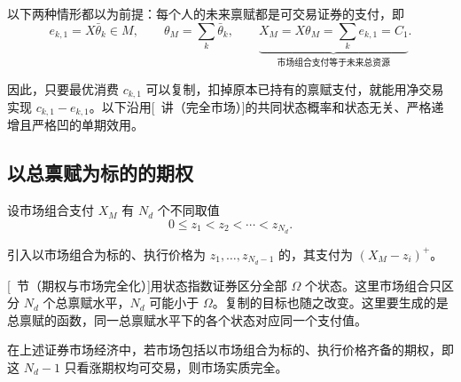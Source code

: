 以下两种情形都以\textbf{}为前提：每个人的未来禀赋都是可交易证券的支付，即
\[
 e_{k,1}=X\bar\theta_k\in M,\qquad
 \theta_M=\sum_k\bar\theta_k,\qquad
 \underbrace{X_M=X\theta_M=\sum_ke_{k,1}=C_1}_{\text{市场组合支付等于未来总资源}}.
\]

因此，只要最优消费 $c_{k,1}$ 可以复制，扣掉原本已持有的禀赋支付，就能用净交易实现 $c_{k,1}-e_{k,1}$。以下沿用[~讲（完全市场）]的共同状态概率和状态无关、严格递增且严格凹的单期效用。

\subsection{以总禀赋为标的的期权}
设市场组合支付 $X_M$ 有 $N_d$ 个不同取值
\[
 0\le z_1<z_2<\cdots<z_{N_d}.
\]

引入以市场组合为标的、执行价格为 $z_1,\ldots,z_{N_d-1}$ 的，其支付为 $(X_M-z_i)^+$。

[~节（期权与市场完全化）]用状态指数证券区分全部 $\Omega$ 个状态。这里市场组合只区分 $N_d$ 个总禀赋水平，$N_d$ 可能小于 $\Omega$。复制的目标也随之改变。这里要生成的是总禀赋的函数，同一总禀赋水平下的各个状态对应同一个支付值。

\begin{tcolorbox}[knowledge]
 在上述证券市场经济中，若市场包括以市场组合为标的、执行价格齐备的期权，即这 $N_d-1$ 只看涨期权均可交易，则市场实质完全。
\end{tcolorbox}

